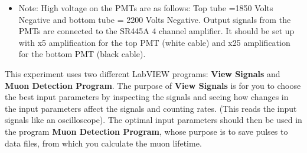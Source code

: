 \documentclass{../lab}
\begin{document}
\begin{itemize}
    \item Note: High voltage on the PMTs are as follows: Top tube =1850 Volts Negative and bottom tube = 2200 Volts Negative. Output signals from the PMTs are connected to the SR445A 4 channel amplifier. It should be set up with x5 amplification for the top PMT (white cable) and x25 amplification for the bottom PMT (black cable).

\end{itemize}

This experiment uses two different LabVIEW programs: \textbf{View Signals} and \textbf{Muon Detection Program}. The purpose of \textbf{View Signals} is for you to choose the best input parameters by inspecting the signals and seeing how changes in the input parameters affect the signals and counting rates. (This reads the input signals like an oscilloscope). The optimal input parameters should then be used in the program \textbf{Muon Detection Program}, whose purpose is to save pulses to data files, from which you calculate the muon lifetime.

\newpage
\end{document}
